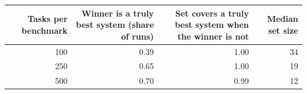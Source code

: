 \begin{tabular}{rrrr}
\toprule
Tasks per benchmark & Winner is a truly best system (share of runs) & Set covers a truly best system when the winner is not & Median set size \\
\midrule
100 & 0.39 & 1.00 & 34 \\
250 & 0.65 & 1.00 & 19 \\
500 & 0.70 & 0.99 & 12 \\
\bottomrule
\end{tabular}
